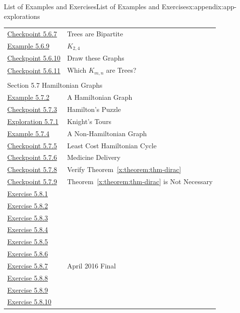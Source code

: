 \documentclass[oneside,10pt,]{book}
\newcommand{\xreffont}{\relax}
\numberwithin{equation}{section}
\begin{document}
\begin{appendixptx}{List of Examples and Exercises}{}{List of Examples and Exercises}{}{}{x:appendix:app-explorations}
\begin{longtable}[l]{ll}
\hyperref[x:exercise:ex-tree-bipartite]{Checkpoint 5.6.7}& Trees are Bipartite\\
\hyperref[x:example:eg-complete-bipartite]{Example 5.6.9}& \(K_{2,4}\)\\
\hyperref[x:exercise:ex-draw-complete-bipartite]{Checkpoint 5.6.10}& Draw these Graphs\\
\hyperref[x:exercise:ex-which-Kmn-are-trees]{Checkpoint 5.6.11}& Which \(K_{m,n}\) are Trees?\\
\multicolumn{2}{l}{\null}\\[1.5ex] \multicolumn{2}{l}{\large Section 5.7 Hamiltonian Graphs}\\[0.5ex]
\hyperref[x:example:eg-hamiltonian]{Example 5.7.2}& A Hamiltonian Graph\\
\hyperref[x:exercise:ex-find-hamiltonian]{Checkpoint 5.7.3}& Hamilton's Puzzle\\
\hyperref[x:exploration:expl-knights-tour]{Exploration 5.7.1}& Knight's Tours\\
\hyperref[x:example:eg-not-hamiltonian]{Example 5.7.4}& A Non-Hamiltonian Graph\\
\hyperref[x:exercise:ex-find-least-cost-hamiltonian]{Checkpoint 5.7.5}& Least Cost Hamiltonian Cycle\\
\hyperref[x:exercise:ex-hamiltonian-]{Checkpoint 5.7.6}& Medicine Delivery\\
\hyperref[x:exercise:ex-verify-dirac]{Checkpoint 5.7.8}& Verify Theorem~{\xreffont\ref*{x:theorem:thm-dirac}}\\
\hyperref[x:exercise:ex-hamiltonian-necessary]{Checkpoint 5.7.9}& Theorem~{\xreffont\ref*{x:theorem:thm-dirac}} is Not Necessary\\
\hyperlink{g:exercise:id492730}{Exercise 5.8.1}& \\
\hyperlink{g:exercise:id492752}{Exercise 5.8.2}& \\
\hyperlink{g:exercise:id492762}{Exercise 5.8.3}& \\
\hyperlink{g:exercise:id492776}{Exercise 5.8.4}& \\
\hyperlink{g:exercise:id492814}{Exercise 5.8.5}& \\
\hyperlink{g:exercise:id492822}{Exercise 5.8.6}& \\
\hyperlink{g:exercise:id492800}{Exercise 5.8.7}& April 2016 Final\\
\hyperlink{g:exercise:id492842}{Exercise 5.8.8}& \\
\hyperlink{g:exercise:id492866}{Exercise 5.8.9}& \\
\hyperlink{g:exercise:id492865}{Exercise 5.8.10}& \\

\end{longtable}
\end{appendixptx}
\end{document}
